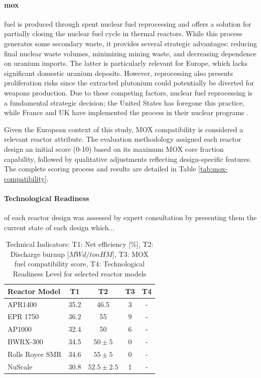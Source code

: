 \paragraph{\gls{mox}} fuel is produced through spent nuclear fuel reprocessing and offers a solution for partially closing the nuclear fuel cycle in thermal reactors. While this process generates some secondary waste, it provides several strategic advantages: reducing final nuclear waste volumes, minimizing mining waste, and decreasing dependence on uranium imports. The latter is particularly relevant for Europe, which lacks significant domestic uranium deposits. However, reprocessing also presents proliferation risks since the extracted plutonium could potentially be diverted for weapons production. Due to these competing factors, nuclear fuel reprocessing is a fundamental strategic decision; the United States has foregone this practice, while France and UK have implemented the process in their nuclear programs \cite{CRS_Reprocessing_Spent_Fuel_2025}.

Given the European context of this study, MOX compatibility is considered a relevant reactor attribute. The evaluation methodology assigned each reactor design an initial score (0-10) based on its maximum MOX core fraction capability, followed by qualitative adjustments reflecting design-specific features. The complete scoring process and results are detailed in Table \ref{tab:mox-compatibility}.


\paragraph{Technological Readiness} of each reactor design was assessed by expert consultation by presenting them the current state of each design which...

\begin{table}[!ht]
    \centering
    \begin{tabularx}{\textwidth}{X c c c c}
        \toprule
        \textbf{Reactor Model} & \textbf{T1} & \textbf{T2} & \textbf{T3} & \textbf{T4}\\
        \midrule
        APR1400         & 35.2 & 46.5 & 3 & - \\
        EPR 1750        & 36.2 & 55 & 9 & -\\
        AP1000          & 32.4 & 50 & 6 & - \\
        BWRX-300        & 34.5 & $50 \pm 5$ & 0 & - \\
        Rolls Royce SMR & 34.6 & $55 \pm 5$ & 0 & - \\
        NuScale         & 30.8 & $52.5 \pm 2.5$ & 1 & - \\
        \bottomrule
    \end{tabularx}
    \caption{Technical Indicators: T1: Net efficiency [\%], T2: Discharge burnup [$MWd/tonHM$], T3: MOX fuel compatibility score, T4: Technological Readiness Level for selected reactor models}
    \label{tab:indicators-technical}
\end{table}


